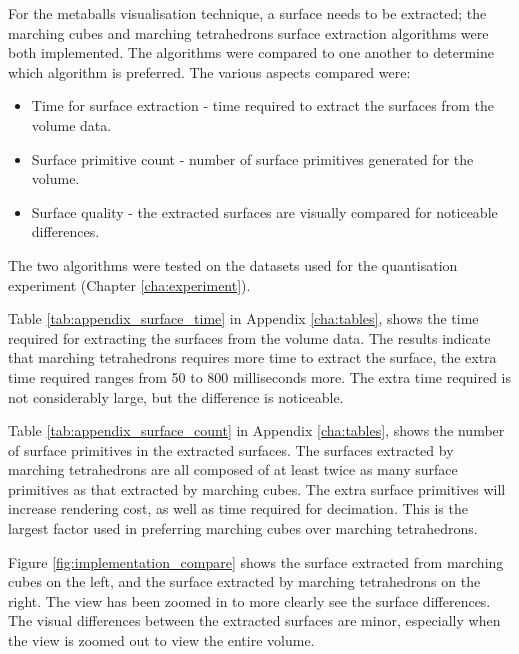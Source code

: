 
For the metaballs visualisation technique, a surface needs to be extracted; the
marching cubes and marching tetrahedrons surface extraction algorithms were
both implemented. The algorithms were compared to one another to determine
which algorithm is preferred. The various aspects compared were:

\begin{itemize}

  \item Time for surface extraction - time required to extract the surfaces
  from the volume data.

  \item Surface primitive count - number of surface primitives generated for
  the volume.

  \item Surface quality - the extracted surfaces are visually compared for
  noticeable differences.

\end{itemize}

The two algorithms were tested on the datasets used for the quantisation
experiment (Chapter \ref{cha:experiment}).

Table \ref{tab:appendix_surface_time} in Appendix \ref{cha:tables}, shows the
time required for extracting the surfaces from the volume data. The results
indicate that marching tetrahedrons requires more time to extract the surface,
the extra time required ranges from 50 to 800 milliseconds more. The extra time
required is not considerably large, but the difference is noticeable.

Table \ref{tab:appendix_surface_count} in Appendix \ref{cha:tables}, shows the
number of surface primitives in the extracted surfaces. The surfaces extracted
by marching tetrahedrons are all composed of at least twice as many surface
primitives as that extracted by marching cubes. The extra surface primitives
will increase rendering cost, as well as time required for decimation. This is
the largest factor used in preferring marching cubes over marching
tetrahedrons.

Figure \ref{fig:implementation_compare} shows the surface extracted from
marching cubes on the left, and the surface extracted by marching tetrahedrons
on the right. The view has been zoomed in to more clearly see the surface
differences. The visual differences between the extracted surfaces are minor,
especially when the view is zoomed out to view the entire volume.

